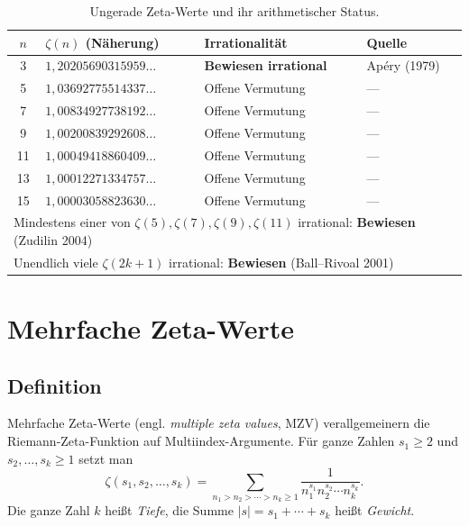 \documentclass[12pt,a4paper]{amsart}
\theoremstyle{definition}
\theoremstyle{remark}
\begin{document}
\begin{table}[h]
  \centering
  \caption{Ungerade Zeta-Werte und ihr arithmetischer Status.}
  \vspace{4pt}
  \begin{tabular}{@{}clll@{}}
    \toprule
    $n$ & $\zeta(n)$ (Näherung) & Irrationalität & Quelle \\
    \midrule
    3  & $1{,}20205690315959\ldots$ & \textbf{Bewiesen irrational} & Apéry (1979) \\
    5  & $1{,}03692775514337\ldots$ & Offene Vermutung            & --- \\
    7  & $1{,}00834927738192\ldots$ & Offene Vermutung            & --- \\
    9  & $1{,}00200839292608\ldots$ & Offene Vermutung            & --- \\
    11 & $1{,}00049418860409\ldots$ & Offene Vermutung            & --- \\
    13 & $1{,}00012271334757\ldots$ & Offene Vermutung            & --- \\
    15 & $1{,}00003058823630\ldots$ & Offene Vermutung            & --- \\
    \midrule
    \multicolumn{4}{l}{Mindestens einer von $\zeta(5), \zeta(7), \zeta(9), \zeta(11)$
    irrational: \textbf{Bewiesen} (Zudilin 2004)} \\
    \multicolumn{4}{l}{Unendlich viele $\zeta(2k+1)$ irrational: \textbf{Bewiesen}
    (Ball--Rivoal 2001)} \\
    \bottomrule
  \end{tabular}
  \label{tab:ungerade-zeta}
\end{table}

\section{Mehrfache Zeta-Werte}

\subsection{Definition}

Mehrfache Zeta-Werte (engl. \emph{multiple zeta values}, MZV) verallgemeinern
die Riemann-Zeta-Funktion auf Multiindex-Argumente. Für ganze Zahlen $s_1 \geq 2$
und $s_2, \ldots, s_k \geq 1$ setzt man
\[
  \zeta(s_1, s_2, \ldots, s_k) = \sum_{n_1 > n_2 > \cdots > n_k \geq 1}
  \frac{1}{n_1^{s_1} n_2^{s_2} \cdots n_k^{s_k}}.
\]
Die ganze Zahl $k$ heißt \emph{Tiefe}, die Summe $|s| = s_1 + \cdots + s_k$
heißt \emph{Gewicht}.
\end{document}
